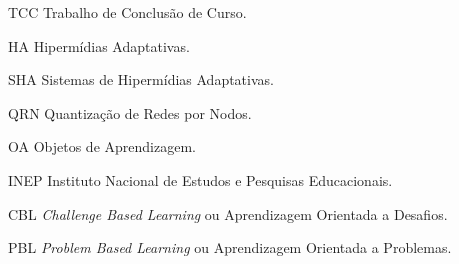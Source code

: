 \begin{siglas}
  \item[TCC] Trabalho de Conclusão de Curso.
  \item[HA] Hipermídias Adaptativas.
  \item[SHA] Sistemas de Hipermídias Adaptativas.
  \item[QRN] Quantização de Redes por Nodos.
  \item[OA] Objetos de Aprendizagem.
  \item[INEP] Instituto Nacional de Estudos e Pesquisas Educacionais.
  \item[CBL] \textit{Challenge Based Learning} ou Aprendizagem Orientada a Desafios.
  \item[PBL] \textit{Problem Based Learning} ou Aprendizagem Orientada a Problemas.
  \end{siglas}
 